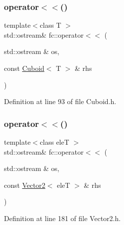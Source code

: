 \subsubsection{\texorpdfstring{operator$<$$<$()}{operator<<()}\hspace{0.1cm}{\footnotesize\ttfamily [1/2]}}
{\footnotesize\ttfamily template$<$class T $>$ \\
std\+::ostream\& fc\+::operator$<$$<$ (\begin{DoxyParamCaption}\item[{std\+::ostream \&}]{os,  }\item[{const \hyperlink{classfc_1_1Cuboid}{Cuboid}$<$ T $>$ \&}]{rhs }\end{DoxyParamCaption})}



Definition at line 93 of file Cuboid.\+h.

\mbox{\label{namespacefc_a17fbd695ac7dd053e973c0e60f93061c}} 
\subsubsection{\texorpdfstring{operator$<$$<$()}{operator<<()}\hspace{0.1cm}{\footnotesize\ttfamily [2/2]}}
{\footnotesize\ttfamily template$<$class eleT $>$ \\
std\+::ostream\& fc\+::operator$<$$<$ (\begin{DoxyParamCaption}\item[{std\+::ostream \&}]{os,  }\item[{const \hyperlink{classfc_1_1Vector2}{Vector2}$<$ eleT $>$ \&}]{rhs }\end{DoxyParamCaption})}



Definition at line 181 of file Vector2.\+h.


